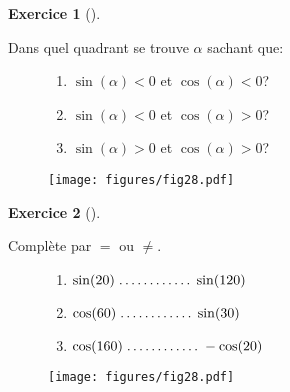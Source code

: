 \documentclass[
  a4paper,
  DIV=11,
  numbers=noendperiod,
  oneside]{scrreprt}
\theoremstyle{definition}
\theoremstyle{definition}
\newtheorem{exercise}{Exercice}[chapter]
\theoremstyle{plain}
\theoremstyle{definition}
\theoremstyle{remark}
\begin{document}
\begin{exercise}[]\protect\hypertarget{exr-quad}{}\label{exr-quad}

Dans quel quadrant se trouve \(\alpha\) sachant que:

\begin{figure}

\begin{minipage}{0.60\linewidth}

\begin{enumerate}
\def\labelenumi{\arabic{enumi})}
\item
  \(\sin(\alpha)<0\) et \(\cos(\alpha)<0\)?
\item
  \(\sin(\alpha)<0\) et \(\cos(\alpha)>0\)?
\item
  \(\sin(\alpha)>0\) et \(\cos(\alpha)>0\)?
\end{enumerate}

\end{minipage}%
%
\begin{minipage}{0.40\linewidth}
\begin{center}
\texttt{[image: figures/fig28.pdf]}
\end{center}
\end{minipage}%

\end{figure}%

\end{exercise}

\begin{exercise}[]\protect\hypertarget{exr-}{}\label{exr-}

Complète par \(=\) ou \(\neq\).

\begin{figure}

\begin{minipage}{0.70\linewidth}

\begin{enumerate}
\def\labelenumi{\arabic{enumi})}
\item
  \(\sin(20)\makebox[2cm]{\dotfill}\sin(120)\)
\item
  \(\cos(60)\makebox[2cm]{\dotfill}\sin(30)\)
\item
  \(\cos(160)\makebox[2cm]{\dotfill}-\cos(20)\)
\end{enumerate}

\end{minipage}%
%
\begin{minipage}{0.30\linewidth}
\begin{center}
\texttt{[image: figures/fig28.pdf]}
\end{center}
\end{minipage}%

\end{figure}%

\end{exercise}
\end{document}

